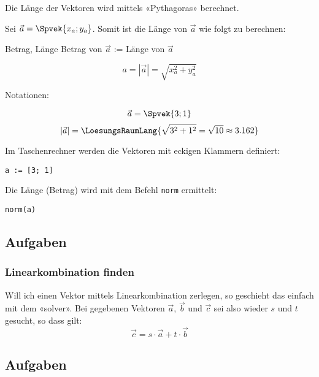 Die Länge der Vektoren wird mittels «Pythagoras» berechnet.

Sei $\vec{a}  = \Spvek{x_a;y_a}$. Somit ist die Länge von
    $\vec{a}$ wie folgt zu berechnen:

    \begin{gesetz}{Betrag, Länge}{}
      Betrag von $\vec{a}$ := Länge von $\vec{a}$

      $$a = |\vec{a}| = \sqrt{x_a^2 + y_a^2}$$
      \end{gesetz}
    Notationen:

    \begin{beispiel}{}{}
      $$ \vec{a}= \Spvek{3;1}$$
        $$|\vec{a}| = \LoesungsRaumLang{\sqrt{3^2+1^2} = \sqrt{10}\approx 3.162}$$
      \end{beispiel}
    

    \begin{bemerkung}{}{}
      Im Taschenrechner werden die Vektoren mit eckigen Klammern
      definiert:

      \texttt{a := [3; 1]}

      Die Länge (Betrag) wird mit dem Befehl \texttt{norm} ermittelt:

      \texttt{norm(a)}
    \end{bemerkung}
    \subsection*{Aufgaben}
\newpage

\newpage

\subsubsection{Linearkombination finden}
Will ich einen Vektor mittels Linearkombination
 zerlegen, so geschieht das einfach mit dem
«solver». Bei gegebenen Vektoren $\vec{a}$, $\vec{b}$ und $\vec{c}$ sei also
wieder $s$ und $t$ gesucht, so dass gilt:
$$\vec{c} = s\cdot{}\vec{a} + t\cdot{}\vec{b}$$


\subsection*{Aufgaben}


